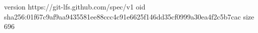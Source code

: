 version https://git-lfs.github.com/spec/v1
oid sha256:01f67c9af9aa9435581ee88ccc4c91e6625f146dd35cf0999a30ea4f2c5b7cac
size 696
